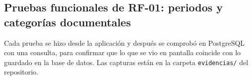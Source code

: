 
\providecommand{\evus}{\textunderscore\allowbreak}
\providecommand{\ev}[1]{{\texttt{\scriptsize\let\_\evus #1}}}

\subsection{Pruebas funcionales de RF-01: periodos y categorías documentales}

Cada prueba se hizo desde la aplicación y después se comprobó en PostgreSQL con una
consulta, para confirmar que lo que se vio en pantalla coincide con lo guardado en la base
de datos. Las capturas están en la carpeta \texttt{evidencias/} del repositorio.

